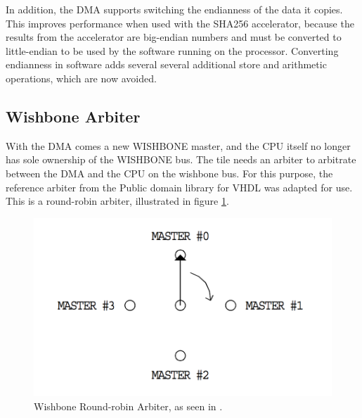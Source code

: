 In addition, the DMA supports switching the endianness of the data it copies. This improves performance
when used with the SHA256 accelerator, because the results from the accelerator are big-endian numbers
and must be converted to little-endian to be used by the software running on the processor. Converting
endianness in software adds several several additional store and arithmetic operations, which are now avoided.

\subsection{Wishbone Arbiter}
With the DMA comes a new WISHBONE master, and the CPU itself no longer has sole ownership of the WISHBONE bus. 
The tile needs an arbiter to arbitrate between the DMA and the CPU
on the wishbone bus. For this purpose, the reference arbiter from the Public domain library for VHDL \cite{WBLibrary}
was adapted for use. This is a round-robin arbiter, illustrated in figure \ref{fig:WBArbiter}.

%
%
\begin{figure}[htb]
    \centering
    \includegraphics[width=1.0\textwidth]{Figures/Tile/WBArbiter}
    \caption{Wishbone Round-robin Arbiter, as seen in \cite{WBLibrary}.}
    \label{fig:WBArbiter}
\end{figure}


